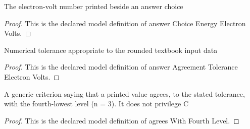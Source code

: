 \begin{definition}
  \label{def:physics:phyx-mini-0658:phyxminiproblems-problemphyxmini0658-answerchoiceenergyelectronvolts}
  The electron-volt number printed beside an answer choice
\end{definition}
\begin{proof}
  This is the declared model definition of answer Choice Energy Electron Volts.
\end{proof}
\begin{definition}
  \label{def:physics:phyx-mini-0658:phyxminiproblems-problemphyxmini0658-answeragreementtoleranceelectronvolts}
  Numerical tolerance appropriate to the rounded textbook input data
\end{definition}
\begin{proof}
  This is the declared model definition of answer Agreement Tolerance Electron Volts.
\end{proof}
\begin{definition}
  \label{def:physics:phyx-mini-0658:phyxminiproblems-problemphyxmini0658-answerchoice-agreeswithfourthlevel}
  A generic criterion saying that a printed value agrees, to the stated tolerance, with the fourth-lowest level (n = 3). It does not privilege C
\end{definition}
\begin{proof}
  This is the declared model definition of agrees With Fourth Level.
\end{proof}
